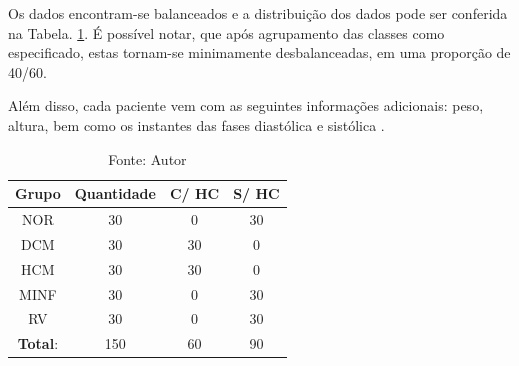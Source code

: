Os dados encontram-se balanceados e a distribuição dos dados pode ser conferida na Tabela. \ref{tab:count_dataset}. É possível notar, que após agrupamento das classes como especificado, estas tornam-se minimamente desbalanceadas, em uma proporção de 40/60.

Além disso, cada paciente vem com as seguintes informações adicionais: peso, altura, bem como os instantes das fases diastólica e sistólica \cite{bernardDeepLearningTechniques2018a}.






\begin{table}[hbtp]
    \centering
    \renewcommand{\arraystretch}{1} %
    \begin{tabular}{|c|c|c|c|}
    \hline 
          \textbf{Grupo} & \textbf{Quantidade} & \textbf{C/ HC} & \textbf{S/ HC}  \\ 
    \hline 
        NOR & 30 & 0 & 30 \\ 
        DCM & 30 & 30 & 0\\ 
        HCM & 30 & 30 & 0\\ 
        MINF & 30 & 0 & 30 \\ 
        RV & 30 & 0 & 30 \\
    \hline 
        \textbf{Total}: & 150  & 60 & 90\\ 
    \hline 
    \end{tabular} 
    \caption{Fonte: Autor}
    \label{tab:count_dataset}
\end{table}

